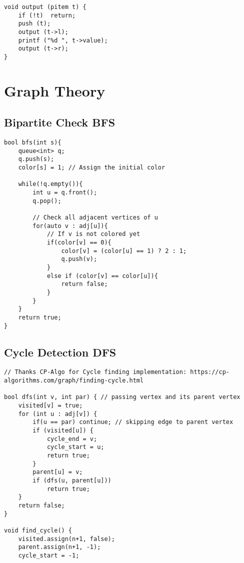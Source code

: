 \documentclass[10pt]{article}
\begin{document}
\begin{multicols*}{2}
\begin{lstlisting}[style=compactcpp]
void output (pitem t) {
    if (!t)  return;
    push (t);
    output (t->l);
    printf ("%d ", t->value);
    output (t->r);
}
\end{lstlisting}


\section{Graph Theory}

\subsection{Bipartite Check BFS}
\begin{lstlisting}[style=compactcpp]
bool bfs(int s){
    queue<int> q;
    q.push(s);
    color[s] = 1; // Assign the initial color
 
    while(!q.empty()){
        int u = q.front();
        q.pop();
 
        // Check all adjacent vertices of u
        for(auto v : adj[u]){
            // If v is not colored yet
            if(color[v] == 0){
                color[v] = (color[u] == 1) ? 2 : 1;
                q.push(v);
            }
            else if (color[v] == color[u]){
                return false;
            }
        }
    }
    return true;
}

\end{lstlisting}

\subsection{Cycle Detection DFS}

\begin{lstlisting}[style=compactcpp]
// Thanks CP-Algo for Cycle finding implementation: https://cp-algorithms.com/graph/finding-cycle.html
 
bool dfs(int v, int par) { // passing vertex and its parent vertex
    visited[v] = true;
    for (int u : adj[v]) {
        if(u == par) continue; // skipping edge to parent vertex
        if (visited[u]) {
            cycle_end = v;
            cycle_start = u;
            return true;
        }
        parent[u] = v;
        if (dfs(u, parent[u]))
            return true;
    }
    return false;
}

void find_cycle() {
    visited.assign(n+1, false);
    parent.assign(n+1, -1);
    cycle_start = -1;
 

\end{lstlisting}
\end{multicols*}
\end{document}
